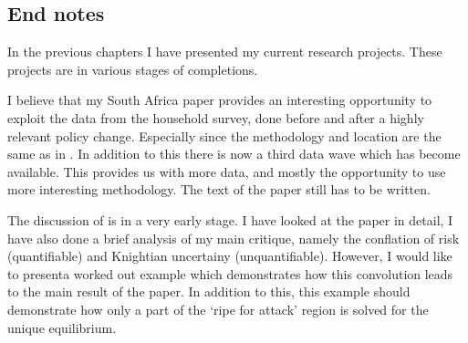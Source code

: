 \documentclass[a4paper]{report}
\begin{document}
\begin{refsection}
\chapter{End notes}
\label{end-notes}
In the previous chapters I have presented my current research projects.
These projects are in various stages of completions.

I believe that my South Africa paper provides an interesting opportunity to exploit the data from the household survey,
done before and after a highly relevant policy change.
Especially since the methodology and location are the same as in \textcite{duflo2000child, duflo2003grandmothers}.
In addition to this there is now a third data wave which has become available.
This provides us with more data, and mostly the opportunity to use more interesting methodology.
The text of the paper still has to be written. 




The discussion of \textcite{morris1998unique} is in a very early stage.
I have looked at the paper in detail, I have also done a brief analysis of my main critique,
namely the conflation of risk (quantifiable) and Knightian uncertainy (unquantifiable).
However, I would like to presenta worked out example which demonstrates how this convolution leads to the main result of the paper.
In addition to this, this example should demonstrate how only a part of the `ripe for attack' region is solved for the unique equilibrium.


\end{refsection}
\end{document}
